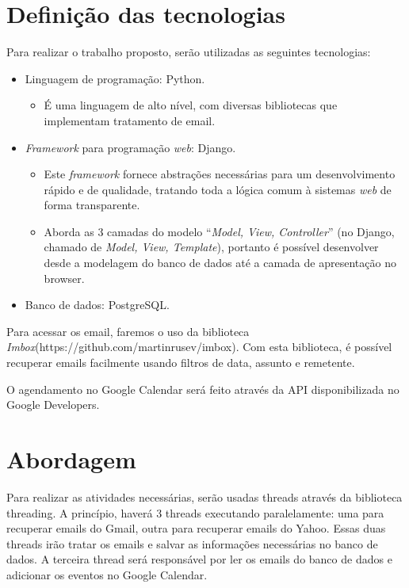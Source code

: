 \documentclass[10pt]{article}
\begin{document}
\MakeScribeTop

\section{Definição das tecnologias}
Para realizar o trabalho proposto, serão utilizadas as seguintes tecnologias:
\begin{itemize}
 \item Linguagem de programação: Python.
 \begin{itemize}
  \item É uma linguagem de alto nível, com diversas bibliotecas que implementam tratamento de email.
 \end{itemize}

 \item \textit{Framework} para programação \textit{web}: Django.
 \begin{itemize}
  \item Este \textit{framework} fornece abstrações necessárias para um desenvolvimento rápido e de qualidade, tratando toda a lógica comum à sistemas \textit{web} de forma transparente. 
  \item Aborda as 3 camadas do modelo ``\textit{Model, View, Controller}'' (no Django, chamado de \textit{Model, View, Template}), portanto é possível desenvolver desde a modelagem do banco de dados até a camada de apresentação no browser.
 \end{itemize}

 \item Banco de dados: PostgreSQL.
\end{itemize}

Para acessar os email, faremos o uso da biblioteca \textit{Imbox}(https://github.com/martinrusev/imbox). Com esta biblioteca, é possível recuperar emails facilmente usando filtros de data, assunto e remetente.

O agendamento no Google Calendar será feito através da API disponibilizada no Google Developers.

\section{Abordagem}
Para realizar as atividades necessárias, serão usadas threads através da biblioteca threading.
A princípio, haverá 3 threads executando paralelamente: uma para recuperar emails do Gmail, outra para recuperar emails do Yahoo. Essas duas threads irão tratar os emails e salvar as informações necessárias no banco de dados. A terceira thread será responsável por ler os emails do banco de dados e adicionar os eventos no Google Calendar.
\end{document}
